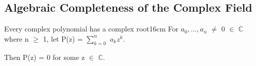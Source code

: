     \vspace{0.5cm}





\subsection{ Algebraic Completeness of the Complex Field }

    \begin{wtheorem}{Every complex polynomial has a complex root}{16cm}
        For $a_0,...,a_n$ $\not =$ 0 $\in$ $\mathbb{C}$ where n $\geq$ 1,
        let P(z) = $\sum_{k=0}^n$ $a_k z^k$.

        Then P(z) = 0 for some z $\in$ $\mathbb{C}$.
    \end{wtheorem}

